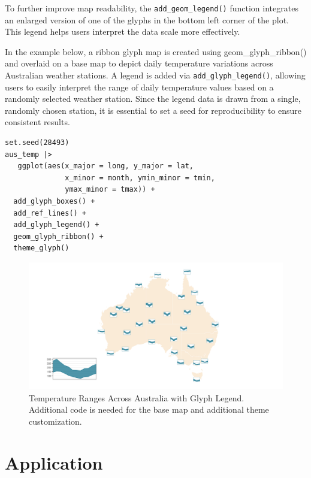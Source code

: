 To further improve map readability, the \texttt{add\_geom\_legend()} function integrates an enlarged version of one of the glyphs in the bottom left corner of the plot. This legend helps users interpret the data scale more effectively.

In the example below, a ribbon glyph map is created using geom\_glyph\_ribbon() and overlaid on a base map to depict daily temperature variations across Australian weather stations. A legend is added via \texttt{add\_glyph\_legend()}, allowing users to easily interpret the range of daily temperature values based on a randomly selected weather station. Since the legend data is drawn from a single, randomly chosen station, it is essential to set a seed for reproducibility to ensure consistent results.

\begin{verbatim}
set.seed(28493)
aus_temp |>
   ggplot(aes(x_major = long, y_major = lat,
              x_minor = month, ymin_minor = tmin,
              ymax_minor = tmax)) +
  add_glyph_boxes() +
  add_ref_lines() +
  add_glyph_legend() +
  geom_glyph_ribbon() +
  theme_glyph() 
\end{verbatim}

\begin{figure}

{\centering \includegraphics[width=1\linewidth]{figures/legend_glyph} 

}

\caption{Temperature Ranges Across Australia with Glyph Legend. Additional code is needed for the base map and additional theme customization.}\label{fig:unnamed-chunk-15}
\end{figure}

\hypertarget{application}{%
\section{Application}\label{application}}


